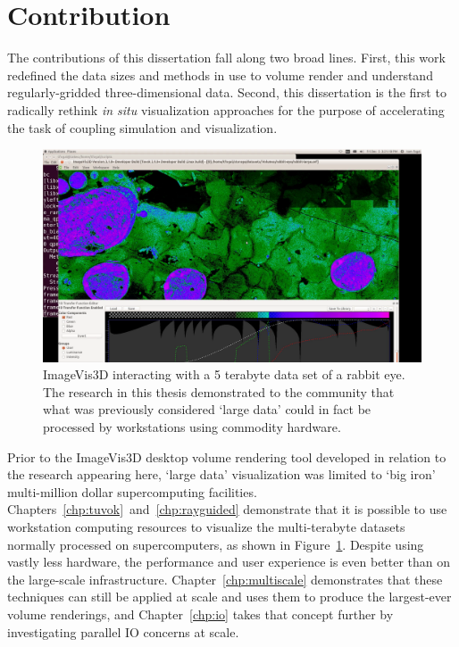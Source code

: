 
\section{Contribution}

The contributions of this dissertation fall along two broad lines.
First, this work redefined the data sizes and methods in use to volume
render and understand regularly-gridded three-dimensional data.
Second, this dissertation is the first to radically rethink \textit{in
situ} visualization approaches for the purpose of accelerating the task
of coupling simulation and visualization.

\begin{figure}
	\includegraphics[width=\linewidth]{images/rabbit5tb}

  \caption{ImageVis3D interacting with a 5 terabyte data set of
  a rabbit eye.  The research in this thesis demonstrated to the
  community that what was previously considered `large data' could in
  fact be processed by workstations using commodity hardware.}

	\label{fig:rabbit5tb}
\end{figure}

Prior to the ImageVis3D desktop volume rendering tool developed in
relation to the research appearing here, `large data' visualization was
limited to `big iron' multi-million dollar supercomputing facilities.
Chapters~\ref{chp:tuvok}~and~\ref{chp:rayguided} demonstrate that it
is possible to use workstation computing resources to visualize the
multi-terabyte datasets normally processed on supercomputers, as shown in
Figure~\ref{fig:rabbit5tb}.  Despite
using vastly less hardware, the performance and user experience is even
better than on the large-scale infrastructure.
Chapter~\ref{chp:multiscale} demonstrates that these techniques can
still be applied at scale and uses them to produce the largest-ever
volume renderings, and Chapter~\ref{chp:io} takes that concept further
by investigating parallel IO concerns at scale.

